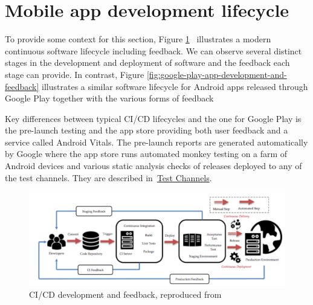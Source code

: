 \section{Mobile app development lifecycle}
To provide some context for this section, Figure \ref{fig:ci-cd-development-and-feedback}~
illustrates a modern continuous software lifecycle including feedback. We can observe several distinct stages in the development and deployment of software and the feedback each stage can provide. %
%
In contrast, Figure \ref{fig:google-play-app-development-and-feedback} illustrates a similar software lifecycle for Android apps released through Google Play together with the various forms of feedback~ 

Key differences between typical CI/CD lifecycles and the one for Google Play is the pre-launch testing and the app store providing both user feedback and a service called Android Vitals. The pre-launch reports are generated automatically by Google where the app store runs automated monkey testing on a farm of Android devices and various static analysis checks of releases deployed to any of the test channels. They are described in~\href{subsection-test-channels}{Test Channels}. %


\begin{figure}
    \includegraphics[width=\linewidth]{images/ci-cd-development-and-feedback.pdf}
    \caption{CI/CD development and feedback, reproduced from~\cite{shahin2019empirical_study_architecting_cd}}
    \label{fig:ci-cd-development-and-feedback}
\end{figure}

